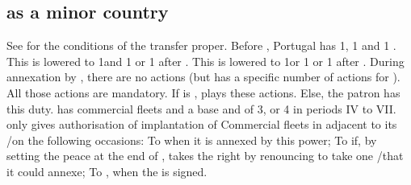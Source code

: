 \subsection{ as a minor
  country}\label{chSpecific:Portugal:Minor}
\aparag See  for the conditions
of the transfer proper.
\aparag Before , Portugal has 1\TFI,
1 \TPaction and 1 \COLaction.
\bparag This is lowered to 1\TFI and 1 \TP or 1 \COLaction after
.
\bparag This is lowered to 1\TradeFLEET or 1 \TP or 1 \COLaction after
.
\bparag During annexation by \SPA, there are no actions (but \SPA has a
specific number of actions for ). All those actions are mandatory.
\bparag If  is \Neutral, \SPA plays these actions. Else,
the patron has this duty.
\aparag {} has commercial fleets and a base \DTI and \FTI
of 3, or 4 in periods IV to VII.
\aparag {} only gives authorisation of implantation of
Commercial fleets in \STZ adjacent to its \COL/\TP on the following
occasions:
\bparag To \SPA when it is annexed by this power;
\bparag To \HOL if, by setting the peace at the end of
, \HOL takes the right by
renouncing to take one \COL/\TP that it could annexe;
\bparag To \ENG, when the  is signed.

